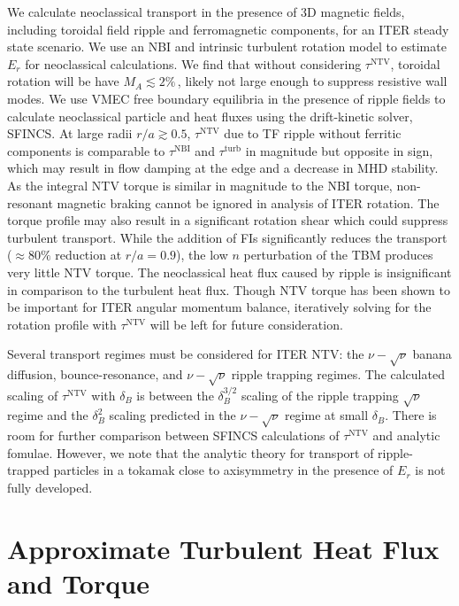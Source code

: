 \documentclass[aip, pop, preprint]{revtex4-1}
\begin{document}
We calculate neoclassical transport in the presence of 3D magnetic fields, including toroidal field ripple and ferromagnetic components, for an ITER steady state scenario. We use an NBI and intrinsic turbulent rotation model to estimate $E_r$ for neoclassical calculations. We find that without considering $\tau^{\mathrm{NTV}}$, toroidal rotation will be have $M_A \lesssim 2\% \,$, likely not large enough to suppress resistive wall modes.\cite{Liu2004} We use VMEC free boundary equilibria in the presence of ripple fields to calculate neoclassical particle and heat fluxes using the drift-kinetic solver, SFINCS. At large radii $r/a \gtrsim 0.5$, $\tau^{\mathrm{NTV}}$ due to TF ripple without ferritic components is comparable to $\tau^{\mathrm{NBI}}$ and $\tau^{\mathrm{turb}}$ in magnitude but opposite in sign, which may result in flow damping at the edge and a decrease in MHD stability. As the integral NTV torque is similar in magnitude to the NBI torque, non-resonant magnetic braking cannot be ignored in analysis of ITER rotation. The torque profile may also result in a significant rotation shear which could suppress turbulent transport. While the addition of FIs significantly reduces the transport ($\approx 80\%$ reduction at $r/a = 0.9$), the low $n$ perturbation of the TBM produces very little NTV torque. The neoclassical heat flux caused by ripple is insignificant in comparison to the turbulent heat flux. Though NTV torque has been shown to be important for ITER angular momentum balance, iteratively solving for the rotation profile with $\tau^{\mathrm{NTV}}$ will be left for future consideration.  

Several transport regimes must be considered for ITER NTV: the $\nu-\sqrt{\nu}$ banana diffusion, bounce-resonance, and $\nu-\sqrt{\nu}$ ripple trapping regimes. The calculated scaling of $\tau^{\mathrm{NTV}}$ with $\delta_B$ is between the $\delta_B^{3/2}$ scaling of the ripple trapping $\sqrt{\nu}$ regime and the $\delta_B^2$ scaling predicted in the $\nu-\sqrt{\nu}$ regime at small $\delta_B$. There is room for further comparison between SFINCS calculations of $\tau^{\mathrm{NTV}}$ and analytic fomulae. However, we note that the analytic theory for transport of ripple-trapped particles in a tokamak close to axisymmetry in the presence of $E_r$ is not fully developed. 

\appendix

\section{Approximate Turbulent Heat Flux and Torque}\label{turbQ}
\end{document}
